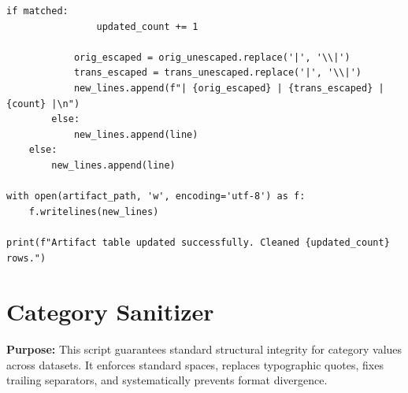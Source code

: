 \documentclass[11pt]{article}
\begin{document}
\begin{lstlisting}[style=pythoncode, caption={clean\_artifact.py}]
            if matched:
                updated_count += 1
                
            orig_escaped = orig_unescaped.replace('|', '\\|')
            trans_escaped = trans_unescaped.replace('|', '\\|')
            new_lines.append(f"| {orig_escaped} | {trans_escaped} | {count} |\n")
        else:
            new_lines.append(line)
    else:
        new_lines.append(line)

with open(artifact_path, 'w', encoding='utf-8') as f:
    f.writelines(new_lines)

print(f"Artifact table updated successfully. Cleaned {updated_count} rows.")
\end{lstlisting}


\section{Category Sanitizer} \label{sec:sanitizer}
\textbf{Purpose:} This script guarantees standard structural integrity for category values across datasets. It enforces standard spaces, replaces typographic quotes, fixes trailing separators, and systematically prevents format divergence.
\end{document}
